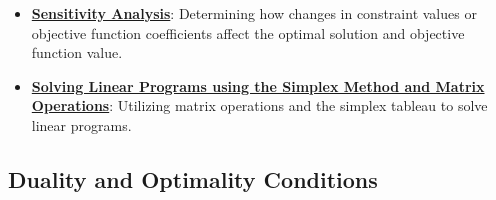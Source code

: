 \documentclass{article}%
\begin{document}
\begin{itemize}[leftmargin=*]
\item \href{https://www.math.purdue.edu/~yipn/421/2024-10-01-SensitivityDuality.pdf#page=7}{\textbf{Sensitivity Analysis}}: Determining how changes in constraint values or objective function coefficients affect the optimal solution and objective function value.%
\item \href{https://www.math.purdue.edu/~yipn/421/2024-10-01-SensitivityDuality.pdf#page=4}{\textbf{Solving Linear Programs using the Simplex Method and Matrix Operations}}: Utilizing matrix operations and the simplex tableau to solve linear programs.%
\end{itemize}

%
\subsection{Duality and Optimality Conditions}%
\label{subsec:DualityandOptimalityConditions}%
\end{document}
